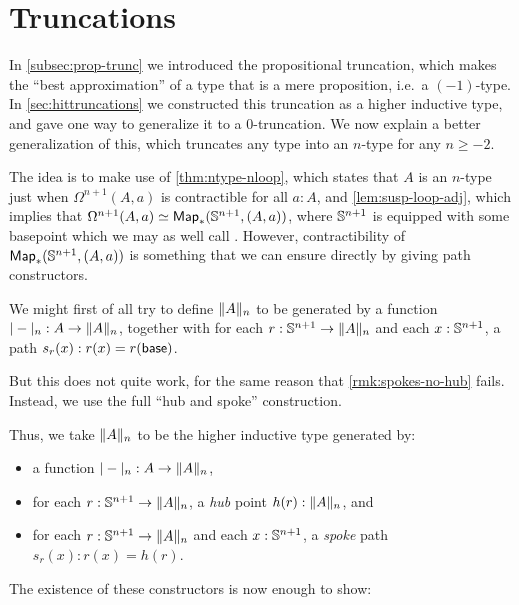 \section{Truncations}
\label{sec:truncations}

In \autoref{subsec:prop-trunc} we introduced the propositional truncation, which makes the ``best approximation'' of a type that is a mere
proposition, i.e.\ a $(-1)$-type.
In \autoref{sec:hittruncations} we constructed this truncation as a higher inductive type, and gave one way to generalize it to a
0-truncation.
We now explain a better generalization of this, which truncates any type into an $n$-type for any $n\geq -2$.

The idea is to make use of \autoref{thm:ntype-nloop}, which states that $A$ is an $n$-type just when $\Omega^{n+1}(A,a)$ is contractible for
all $a:A$, and \autoref{lem:susp-loop-adj}, which implies that $\Omega^{n+1}(A,a) \simeq \Map_*(\Sn^{n+1},(A,a))$, where $\Sn^{n+1}$ is
equipped with some basepoint which we may as well call \base.
However, contractibility of $\Map_*(\Sn^{n+1},(A,a))$ is something that we can ensure directly by giving path constructors.

We might first of all try to define $\trunc nA$ to be generated by a function $\tproj n- : A \to \trunc n A$, together with for each
$r:\Sn^{n+1} \to \trunc n A$ and each $x:\Sn^{n+1}$, a path $s_r(x):r(x) = r(\base)$.

But this does not quite work, for the same reason that \autoref{rmk:spokes-no-hub} fails.
Instead, we use the full ``hub and spoke'' construction.

Thus, we take $\trunc nA$ to be the higher inductive type generated by:
\begin{itemize}
\item a function $\tproj n- : A \to \trunc n A$,
\item for each $r:\Sn^{n+1} \to \trunc n A$, a \emph{hub} point $h(r):\trunc n A$, and
\item for each $r:\Sn^{n+1} \to \trunc n A$ and each $x:\Sn^{n+1}$, a \emph{spoke} path $s_r(x):r(x) = h(r)$.
\end{itemize}

The existence of these constructors is now enough to show:

